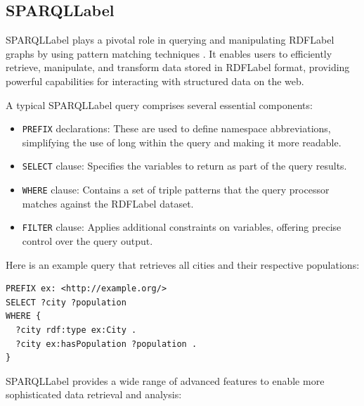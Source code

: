 \subsection{\acrfull{SPARQLLabel}}\label{II-subsec:sparql}

\acrshort{SPARQLLabel} plays a pivotal role in querying and manipulating \acrshort{RDFLabel} graphs by using pattern matching techniques \cite{ericprudhommeauxSPARQLQueryLanguage2008}. It enables users to efficiently retrieve, manipulate, and transform data stored in \acrshort{RDFLabel} format, providing powerful capabilities for interacting with structured data on the web.

A typical \acrshort{SPARQLLabel} query comprises several essential components:

\begin{itemize}
    \item \texttt{PREFIX} declarations: These are used to define namespace abbreviations, simplifying the use of long  within the query and making it more readable.
    \item \texttt{SELECT} clause: Specifies the variables to return as part of the query results.
    \item \texttt{WHERE} clause: Contains a set of triple patterns that the query processor matches against the \acrshort{RDFLabel} dataset.
    \item \texttt{FILTER} clause: Applies additional constraints on variables, offering precise control over the query output.
\end{itemize}

Here is an example query that retrieves all cities and their respective populations:

\begin{lstlisting}[caption=Example SPARQL query that retrieves all cities and their population, label={lst:sparql-example}]
PREFIX ex: <http://example.org/> 
SELECT ?city ?population 
WHERE { 
  ?city rdf:type ex:City . 
  ?city ex:hasPopulation ?population . 
} 
\end{lstlisting}

\acrshort{SPARQLLabel} provides a wide range of advanced features to enable more sophisticated data retrieval and analysis:


